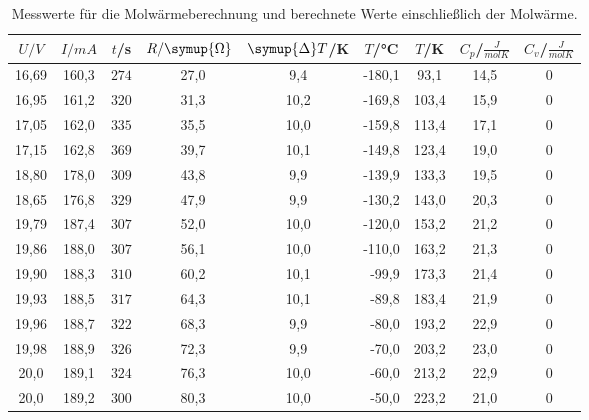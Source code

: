 \begin{table}
    \centering
    \caption{Messwerte für die Molwärmeberechnung und berechnete Werte einschließlich der Molwärme.}
    \label{Tab1}
    \begin{tabular}{S[table-format=2.1] S S S[table-format=2.1] S S S S S} %
      \toprule
       {$U/ \si{V}$}& {$I/\si{mA}$} & {$t$/s} & {$R/\symup{\Omega}$} & {$\symup{\Delta}T$/K} & {$T$/°C} & {$T$/K} & {$C_{\si{p}}$/$\frac{\si{J}}{\si{molK}}$} &{$C_{\si{v}}$/$\frac{\si{J}}{\si{molK}}$} \\
      \midrule
      \midrule
          {16,69} & {160,3}  & {$274$} & {~27,0} &  9,4 & {-180,1} &  93,1 & {14,5} & 0 \\
          {16,95} & {161,2}  & {$320$} & {~31,3} & 10,2 & {-169,8} & 103,4 & {15,9} & 0 \\
          {17,05} & {162,0}  & {$335$} & {~35,5} & 10,0 & {-159,8} & 113,4 & {17,1} & 0 \\
          {17,15} & {162,8}  & {$369$} & {~39,7} & 10,1 & {-149,8} & 123,4 & {19,0} & 0 \\
          {18,80} & {178,0}  & {$309$} & {~43,8} &  9,9 & {-139,9} & 133,3 & {19,5} & 0 \\
          {18,65} & {176,8}  & {$329$} & {~47,9} &  9,9 & {-130,2} & 143,0 & {20,3} & 0 \\
          {19,79} & {187,4}  & {$307$} & {~52,0} & 10,0 & {-120,0} & 153,2 & {21,2} & 0 \\
          {19,86} & {188,0}  & {$307$} & {~56,1} & 10,0 & {-110,0} & 163,2 & {21,3} & 0 \\
          {19,90} & {188,3}  & {$310$} & {~60,2} & 10,1 & {~-99,9} & 173,3 & {21,4} & 0 \\
          {19,93} & {188,5}  & {$317$} & {~64,3} & 10,1 & {~-89,8} & 183,4 & {21,9} & 0 \\
          {19,96} & {188,7}  & {$322$} & {~68,3} &  9,9 & {~-80,0} & 193,2 & {22,9} & 0 \\
          {19,98} & {188,9}  & {$326$} & {~72,3} &  9,9 & {~-70,0} & 203,2 & {23,0} & 0 \\
          {20,0 } & {189,1}  & {$324$} & {~76,3} & 10,0 & {~-60,0} & 213,2 & {22,9} & 0 \\
          {20,0 } & {189,2}  & {$300$} & {~80,3} & 10,0 & {~-50,0} & 223,2 & {21,0} & 0 \\

\end{tabular}
\end{table}
